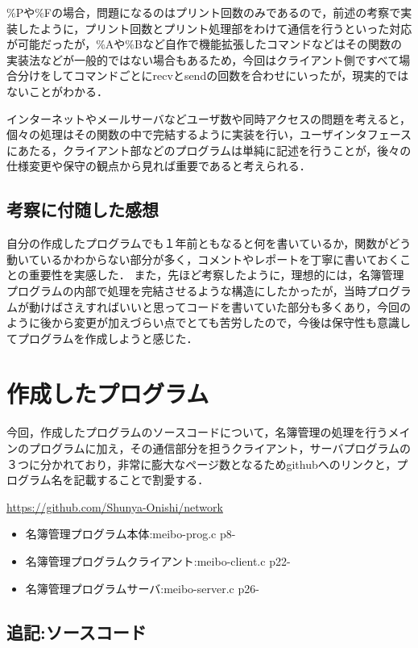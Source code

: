 \documentclass[a4j]{jarticle}
\begin{document}
\%Pや\%Fの場合，問題になるのはプリント回数のみであるので，前述の考察で実装したように，プリント回数とプリント処理部をわけて通信を行うといった対応が可能だったが，\%Aや\%Bなど自作で機能拡張したコマンドなどはその関数の実装法などが一般的ではない場合もあるため，今回はクライアント側ですべて場合分けをしてコマンドごとにrecvとsendの回数を合わせにいったが，現実的ではないことがわかる．

インターネットやメールサーバなどユーザ数や同時アクセスの問題を考えると，個々の処理はその関数の中で完結するように実装を行い，ユーザインタフェースにあたる，クライアント部などのプログラムは単純に記述を行うことが，後々の仕様変更や保守の観点から見れば重要であると考えられる．

\subsection{考察に付随した感想}
自分の作成したプログラムでも１年前ともなると何を書いているか，関数がどう動いているかわからない部分が多く，コメントやレポートを丁寧に書いておくことの重要性を実感した．
また，先ほど考察したように，理想的には，名簿管理プログラムの内部で処理を完結させるような構造にしたかったが，当時プログラムが動けばさえすればいいと思ってコードを書いていた部分も多くあり，今回のように後から変更が加えづらい点でとても苦労したので，今後は保守性も意識してプログラムを作成しようと感じた．


\section{作成したプログラム}
今回，作成したプログラムのソースコードについて，名簿管理の処理を行うメインのプログラムに加え，その通信部分を担うクライアント，サーバプログラムの３つに分かれており，非常に膨大なページ数となるためgithubへのリンクと，プログラム名を記載することで割愛する．

\url{https://github.com/Shunya-Onishi/network}

\begin{itemize}
\item 名簿管理プログラム本体:meibo-prog.c p8-
\item 名簿管理プログラムクライアント:meibo-client.c p22-
\item 名簿管理プログラムサーバ:meibo-server.c p26-
\end{itemize}

\newpage

\subsection{追記:ソースコード}
\end{document}
